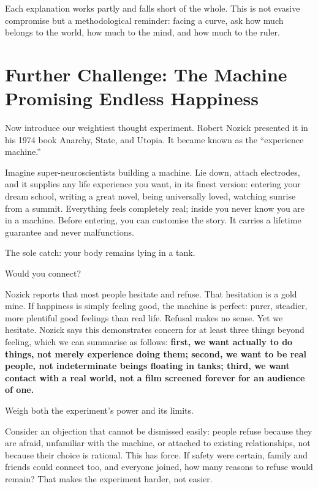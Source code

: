 Each explanation works partly and falls short of the whole. This is not evasive compromise but a methodological reminder: facing a curve, ask how much belongs to the world, how much to the mind, and how much to the ruler.

\section[Further Challenge: The Pleasure Machine]{Further Challenge: The Machine Promising Endless Happiness}
Now introduce our weightiest thought experiment. Robert Nozick presented it in his 1974 book Anarchy, State, and Utopia. It became known as the ``experience machine.''

Imagine super-neuroscientists building a machine. Lie down, attach electrodes, and it supplies any life experience you want, in its finest version: entering your dream school, writing a great novel, being universally loved, watching sunrise from a summit. Everything feels completely real; inside you never know you are in a machine. Before entering, you can customise the story. It carries a lifetime guarantee and never malfunctions.

The sole catch: your body remains lying in a tank.

Would you connect?

Nozick reports that most people hesitate and refuse. That hesitation is a gold mine. If happiness is simply feeling good, the machine is perfect: purer, steadier, more plentiful good feelings than real life. Refusal makes no sense. Yet we hesitate. Nozick says this demonstrates concern for at least three things beyond feeling, which we can summarise as follows: \textbf{first, we want actually to do things, not merely experience doing them; second, we want to be real people, not indeterminate beings floating in tanks; third, we want contact with a real world, not a film screened forever for an audience of one.}

Weigh both the experiment's power and its limits.

Consider an objection that cannot be dismissed easily: people refuse because they are afraid, unfamiliar with the machine, or attached to existing relationships, not because their choice is rational. This has force. If safety were certain, family and friends could connect too, and everyone joined, how many reasons to refuse would remain? That makes the experiment harder, not easier.

